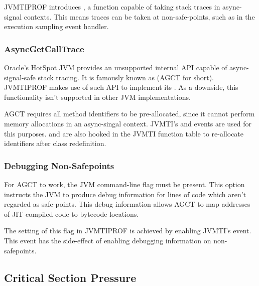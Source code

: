 JVMTIPROF introduces , a function capable of taking stack traces in async-signal contexts. This means traces can be taken at non-safe-points, such as in the execution sampling event handler.

\subsubsection*{AsyncGetCallTrace}

Oracle's HotSpot JVM provides an unsupported internal API capable of async-signal-safe stack tracing. It is famously known as  (AGCT for short). JVMTIPROF makes use of such API to implement its . As a downside, this functionality isn't supported in other JVM implementations.

AGCT requires all method identifiers to be pre-allocated, since it cannot perform memory allocations in an async-singal context. JVMTI's  and  events are used for this purposes.  and  are also hooked in the JVMTI function table to re-allocate identifiers after class redefinition.

\subsubsection*{Debugging Non-Safepoints}

For AGCT to work, the JVM command-line flag  must be present. This option instructs the JVM to produce debug information for lines of code which aren't regarded as safe-points. This debug information allows AGCT to map addresses of JIT compiled code to bytecode locations.

The setting of this flag in JVMTIPROF is achieved by enabling JVMTI's  event. This event has the side-effect of enabling debugging information on non-safepoints. 



\subsection{Critical Section Pressure}


